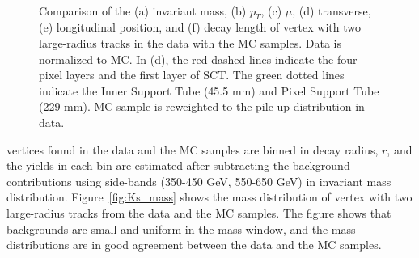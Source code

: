 \begin{figure}[!htb]
     \\
    \caption{Comparison of the (a) invariant mass, (b) $p_{T}$, (c) $\mu$, (d) transverse, (e) longitudinal position, and (f) decay length of \Ks vertex with two large-radius tracks in the data with the MC samples. Data is normalized to MC. In (d), the red dashed lines indicate the four pixel layers and the first layer of SCT. The green dotted lines indicate the Inner Support Tube (45.5 mm) and Pixel Support Tube (229 mm). MC sample is reweighted to the pile-up distribution in data.}
    \label{fig:Ks_data_MC}
\end{figure}

\Ks vertices found in the data and the MC samples are binned in decay radius, $r$, and the \Ks yields in each bin are estimated after subtracting the background contributions using side-bands (350-450 GeV, 550-650 GeV) in invariant mass distribution. Figure~\ref{fig:Ks_mass} shows the mass distribution of \Ks vertex with two large-radius tracks from the data and the MC samples. The figure shows that backgrounds are small and uniform in the mass window, and the mass distributions are in good agreement between the data and the MC samples.

